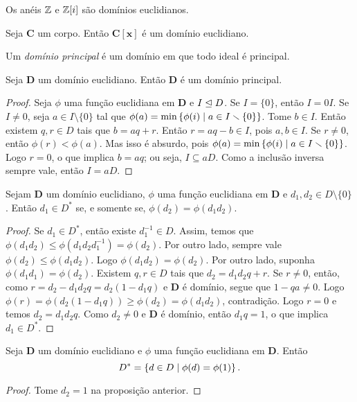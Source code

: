 \begin{exercise}
Os anéis $\mathbb{Z}$ e $\mathbb{Z}[i]$ são domínios euclidianos.
\end{exercise}

\begin{exercise}
Seja $\bm C$ um corpo. Então $\bm{C[x]}$ é um domínio euclidiano.
\end{exercise}

\begin{definition}
Um \emph{domínio principal} é um domínio em que todo ideal é principal.
\end{definition}

\begin{proposition}
 Seja $\bm D$ um domínio euclidiano. Então $\bm D$ é um domínio principal.
\end{proposition}
\begin{proof}
Seja $\phi$ uma função euclidiana em $\bm D$ e $I \mathrel{\unlhd} D$. Se $I = \{0\}$, então $I = 0I$. Se $I \neq 0$, seja $a \in I \setminus \{0\}$ tal que $\phi(a) = \min\left\{{\phi(i)}\;\middle\vert\;{a \in I \smallsetminus \{0\}}\right\}$. Tome $b \in I$. Então existem $q,r \in D$ tais que $b=aq+r$. Então $r = aq-b \in I$, pois $a,b \in I$. Se $r \neq 0$, então $\phi(r) < \phi(a)$. Mas isso é absurdo, pois $\phi(a) = \min\left\{{\phi(i)}\;\middle\vert\;{a \in I \smallsetminus \{0\}}\right\}$. Logo $r=0$, o que implica $b=aq$; ou seja, $I \subseteq aD$. Como a inclusão inversa sempre vale, então $I=aD$.
\end{proof}

\begin{proposition}
Sejam $\bm D$ um domínio euclidiano, $\phi$ uma função euclidiana em $\bm D$ e $d_1,d_2 \in D \setminus \{0\}$. Então $d_1 \in D^*$ se, e somente se, $\phi(d_2) = \phi(d_1d_2)$.
\end{proposition}
\begin{proof}
	Se $d_1 \in D^*$, então existe $d_1^{-1} \in D$. Assim, temos que $\phi(d_1d_2) \leq \phi(d_1d_2d_1^{-1})=\phi(d_2)$. Por outro lado, sempre vale $\phi(d_2) \leq \phi(d_1d_2)$. Logo $\phi(d_1d_2)=\phi(d_2)$. Por outro lado, suponha $\phi(d_1d_1)=\phi(d_2)$. Existem $q,r \in D$ tais que $d_2 = d_1d_2q+r$. Se $r \neq 0$, então, como $r = d_2-d_1d_2q = d_2(1-d_1q)$ e $\bm D$ é domínio, segue que $1-qa \neq 0$. Logo $\phi(r)=\phi(d_2(1-d_1q)) \geq \phi(d_2) = \phi(d_1d_2)$, contradição. Logo $r=0$ e temos $d_2=d_1d_2q$. Como $d_2 \neq 0$ e $\bm D$ é domínio, então $d_1q = 1$, o que implica $d_1 \in D^*$.
\end{proof}

\begin{proposition}
Seja $\bm D$ um domínio euclidiano e $\phi$ uma função euclidiana em $\bm D$. Então
	\begin{equation*}
	D^* = \left\{{d \in D}\;\middle\vert\;{\phi(d)=\phi(1)}\right\}.
	\end{equation*}
\end{proposition}
\begin{proof}
Tome $d_2=1$ na proposição anterior.
\end{proof}

